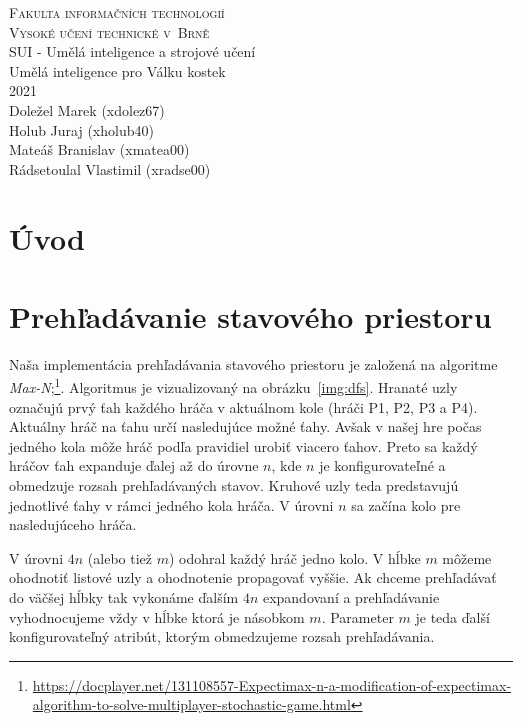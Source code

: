 \documentclass[a4paper, 11pt]{article}
\begin{document}
\begin{titlepage}
	\begin{center}
		\Huge
		\textsc{Fakulta informačních technologií \\
			Vysoké učení technické v~Brně} \\
		{\LARGE
			SUI - Umělá inteligence a strojové učení \\ 
			\medskip 
			\Large{
				Umělá inteligence pro Válku kostek
			}
			}
		\setlength{\parindent}{0.3em}\\
		{\Large 2021} \\
		{\Large Doležel Marek (xdolez67)} \\
		{\Large Holub Juraj (xholub40)} \\
		{\Large Mateáš Branislav (xmatea00)} \\
		{\Large Rádsetoulal Vlastimil (xradse00)}
	\end{center}
\end{titlepage}

\tableofcontents
\newpage

\section{Úvod}



\section{Prehľadávanie stavového priestoru}\label{sec:dfs}

Naša implementácia prehľadávania stavového priestoru je založená na algoritme \textit{Max-N};\footnote{\url{https://docplayer.net/131108557-Expectimax-n-a-modification-of-expectimax-algorithm-to-solve-multiplayer-stochastic-game.html}}. Algoritmus je vizualizovaný na obrázku~\ref{img:dfs}. Hranaté uzly označujú prvý ťah každého hráča v aktuálnom kole (hráči P1, P2, P3 a P4). Aktuálny hráč na ťahu určí nasledujúce možné ťahy. Avšak v našej hre počas jedného kola môže hráč podľa pravidiel urobiť viacero ťahov. Preto sa každý hráčov ťah expanduje ďalej až do úrovne $n$, kde $n$ je konfigurovateľné a obmedzuje rozsah prehľadávaných stavov. Kruhové uzly teda predstavujú jednotlivé ťahy v rámci jedného kola hráča. V úrovni $n$ sa začína kolo pre nasledujúceho hráča. 

V úrovni $4n$ (alebo tiež $m$) odohral každý hráč jedno kolo. V hĺbke $m$ môžeme ohodnotiť listové uzly a ohodnotenie propagovať vyššie. Ak chceme prehľadávať do väčšej hĺbky tak vykonáme ďalším $4n$ expandovaní a prehľadávanie vyhodnocujeme vždy v hĺbke ktorá je násobkom $m$. Parameter $m$ je teda ďalší konfigurovateľný atribút, ktorým obmedzujeme rozsah prehľadávania.
\end{document}
